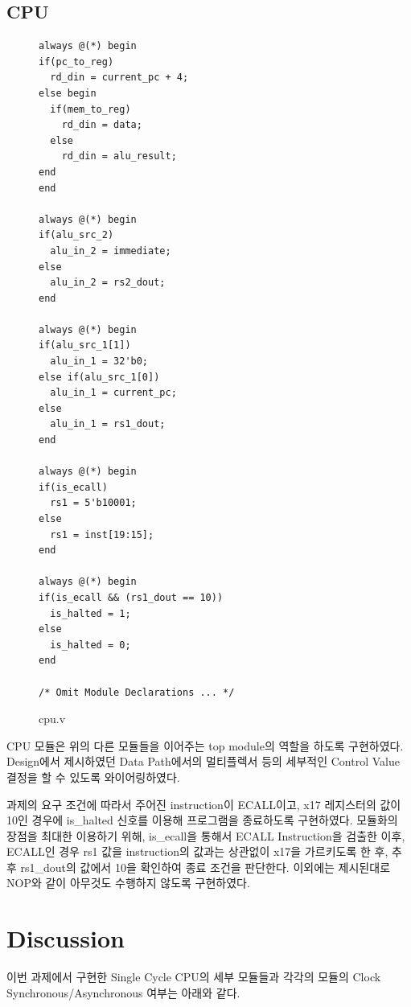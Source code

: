 \documentclass[openright, a4paper]{article}
\begin{document}
\subsection{CPU}

\begin{figure}[h]
    \begin{verbatim}
always @(*) begin
if(pc_to_reg)
  rd_din = current_pc + 4;
else begin
  if(mem_to_reg)
    rd_din = data;
  else
    rd_din = alu_result;
end
end

always @(*) begin
if(alu_src_2)
  alu_in_2 = immediate;
else
  alu_in_2 = rs2_dout;
end

always @(*) begin
if(alu_src_1[1])
  alu_in_1 = 32'b0;
else if(alu_src_1[0])
  alu_in_1 = current_pc;
else
  alu_in_1 = rs1_dout;
end

always @(*) begin
if(is_ecall)
  rs1 = 5'b10001;
else
  rs1 = inst[19:15];
end

always @(*) begin
if(is_ecall && (rs1_dout == 10))
  is_halted = 1;
else
  is_halted = 0;
end

/* Omit Module Declarations ... */
    \end{verbatim}
    \caption{cpu.v}
\end{figure}

CPU 모듈은 위의 다른 모듈들을 이어주는 top module의 역할을 하도록 구현하였다. Design에서 제시하였던 Data Path에서의 멀티플렉서 등의 세부적인 Control Value 결정을 할 수 있도록 와이어링하였다.

과제의 요구 조건에 따라서 주어진 instruction이 ECALL이고, x17 레지스터의 값이 10인 경우에 is_halted 신호를 이용해 프로그램을 종료하도록 구현하였다. 모듈화의 장점을 최대한 이용하기 위해, is_ecall을 통해서 ECALL Instruction을 검출한 이후, ECALL인 경우 rs1 값을 instruction의 값과는 상관없이 x17을 가르키도록 한 후, 추후 rs1_dout의 값에서 10을 확인하여 종료 조건을 판단한다. 이외에는 제시된대로 NOP와 같이 아무것도 수행하지 않도록 구현하였다.

\section{Discussion}
이번 과제에서 구현한 Single Cycle CPU의 세부 모듈들과 각각의 모듈의 Clock Synchronous/Asynchronous 여부는 아래와 같다.
\end{document}
